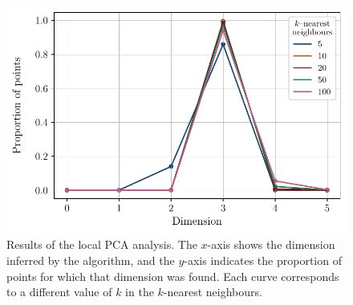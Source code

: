 \documentclass[11pt,a4paper]{article}
\begin{document}
	\begin{figure}
		\centering
		\includegraphics[scale=0.75]{Figures/Local_PCA_21_05_2025.pdf}
		\caption{Results of the local PCA analysis. The $x$-axis shows the dimension inferred by the algorithm, and the $y$-axis indicates the proportion of points for which that dimension was found. Each curve corresponds to a different value of $k$ in the $k$-nearest neighbours.}
		\label{fig:local_pca}
	\end{figure}
	
\end{document}
